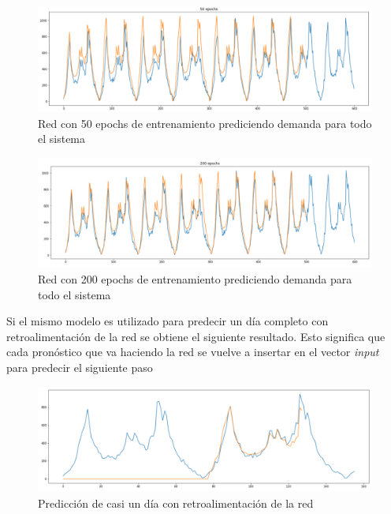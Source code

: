 \documentclass[12pt,spanish]{article}
\begin{document}
	\begin{figure}[H]
		\centering
		\includegraphics[width=15cm]{Imagenes/full_50_epochs.PNG}
		\begin{centering}
			\caption{Red con 50 epochs de entrenamiento prediciendo demanda para todo el sistema}
		\end{centering}
	\end{figure}
	\begin{figure}[H]
		\centering
		\includegraphics[width=15cm]{Imagenes/full_200_epochs.PNG}
		\begin{centering}
			\caption{Red con 200 epochs de entrenamiento prediciendo demanda para todo el sistema}
		\end{centering}
	\end{figure}
	Si el mismo modelo es utilizado para predecir un día completo con retroalimentación de la red se obtiene el siguiente resultado. Esto significa que cada pronóstico que va haciendo la red se vuelve a insertar en el vector \textit{input} para predecir el siguiente paso
	\begin{figure}[H]
		\centering
		\includegraphics[width=15cm]{Imagenes/model_predict_1_day.PNG}
		\begin{centering}
			\caption{Predicción de casi un día con retroalimentación de la red}
		\end{centering}
	\end{figure}
\end{document}
